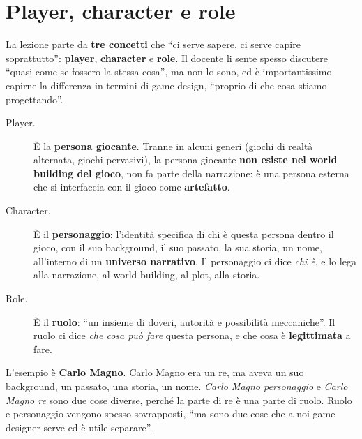 \section{Player, character e role}
\label{a4:sec:pcr}



La lezione parte da \textbf{tre concetti} che ``ci serve sapere, ci serve capire
soprattutto'': \textbf{player}, \textbf{character} e \textbf{role}. Il docente li
sente spesso discutere ``quasi come se fossero la stessa cosa'', ma non lo sono,
ed è importantissimo capirne la differenza in termini di game design, ``proprio di
che cosa stiamo progettando''.

\begin{description}
  \item[Player.] È la \textbf{persona giocante}. Tranne in alcuni generi (giochi di
        realtà alternata, giochi pervasivi), la persona giocante \textbf{non esiste
        nel world building del gioco}, non fa parte della narrazione: è una
        persona esterna che si interfaccia con il gioco come
        \textbf{artefatto}.
  \item[Character.] È il \textbf{personaggio}: l'identità specifica di chi è
        questa persona dentro il gioco, con il suo background, il suo passato, la
        sua storia, un nome, all'interno di un \textbf{universo narrativo}. Il
        personaggio ci dice \emph{chi è}, e lo lega alla narrazione, al world
        building, al plot, alla storia.
  \item[Role.] È il \textbf{ruolo}: ``un insieme di doveri, autorità e possibilità
        meccaniche''. Il ruolo ci dice \emph{che cosa può fare} questa persona, e
        che cosa è \textbf{legittimata} a fare.
\end{description}

L'esempio è \textbf{Carlo Magno}. Carlo Magno era un re, ma aveva un suo
background, un passato, una storia, un nome. \emph{Carlo Magno personaggio} e
\emph{Carlo Magno re} sono due cose diverse, perché la parte di re è una parte di
ruolo. Ruolo e personaggio vengono spesso sovrapposti, ``ma sono due cose che a
noi game designer serve ed è utile separare''.


